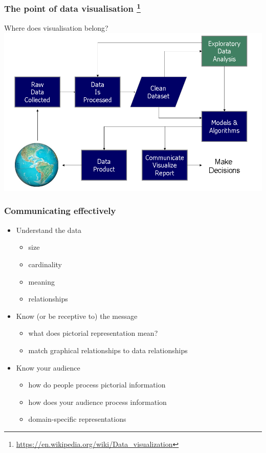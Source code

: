 \begin{frame}
  \frametitle{The point of data visualisation
  \footnote{\tiny{\href{https://en.wikipedia.org/wiki/Data_visualization}{https://en.wikipedia.org/wiki/Data\_visualization}}}
  }
    \textcolor{hutton_green}{Where does visualisation belong?}
    \includegraphics[width=\textwidth]{images/decisions}
\end{frame}


\begin{frame}
  \frametitle{Communicating effectively}
      \begin{itemize}  
        \item <1->\textcolor{hutton_green}{Understand the data}
        \begin{itemize}
          \item <2->size
          \item <2->cardinality
          \item <2->meaning
          \item <2->relationships
        \end{itemize}
        \item <1->\textcolor{hutton_blue}{Know (or be receptive to) the message}
        \begin{itemize}
          \item <3->what does pictorial representation mean?
          \item <3->match graphical relationships to data relationships
        \end{itemize}
        \item <1->\textcolor{hutton_purple}{Know your audience}
        \begin{itemize}
          \item <4->how do people process pictorial information
          \item <4->how does your audience process information
          \item <4->domain-specific representations
        \end{itemize}
      \end{itemize}  
\end{frame}